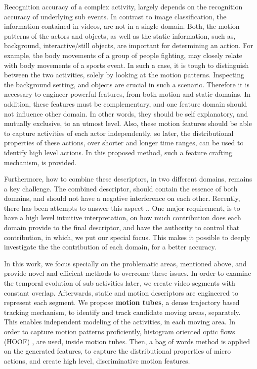 Recognition accuracy of a complex activity, largely depends on the recognition accuracy 
of underlying sub events. In contrast to image classification, the information contained in videos, 
are not 
 in a single domain. Both, the motion patterns of the actors and objects, as well as the static
 information, such as, background, interactive/still objects, are important for determining an action.
For example, the body movements of a group of people fighting, may closely relate with 
body movements of a sports event. In such a case, it is tough to distinguish between the two 
activities, solely by looking at the motion patterns. Inspecting the background setting, 
and objects are crucial in such a scenario. Therefore it is necessary to engineer powerful features,
from both motion and static domains. In addition, these features must be complementary, and one feature domain should 
not influence other domain. In other words, they should be self explanatory, and mutually exclusive, to an utmost level. 
Also, these motion features should be able to capture
activities of each actor independently, so later, the distributional properties of these actions, over shorter 
and longer time ranges, can be used to identify high level actions. In this proposed method, such a feature crafting mechanism, is provided. 

Furthermore, how to combine these descriptors, in two different domains, remains a key challenge.
The combined descriptor, should contain the essence of both domains, and should not have a 
negative interference on each other. Recently, there has been attempts to answer this aspect \cite{7486474},\cite{simonyan2014two}. 
One major requirement, is to 
have a high level intuitive interpretation, on how much contribution does each domain provide to the 
final descriptor, and have the authority to control that contribution, in which, we put 
our special focus. This makes it possible 
to deeply investigate the the contribution of each domain, for a better accuracy. 

In this work, we focus specially on the problematic areas, mentioned above, and provide 
novel and efficient methods to overcome these issues. In order to examine the temporal evolution 
of sub activities later, we create video segments with constant overlap. Afterwards, static and motion
descriptors are engineered to represent each segment. We propose \textbf{motion tubes},
a dense trajectory \cite{wang2011action} based tracking mechanism, to identify and track candidate moving areas, 
separately. This enables independent modeling of the activities, in each moving area.
In order to capture motion patterns proficiently, histogram oriented optic flows (HOOF) \cite{chaudhry2009histograms}
, are used, inside motion tubes. Then, a bag of words method is applied on the generated 
features, to capture the distributional properties of micro actions, and create high level, discriminative motion features. 


